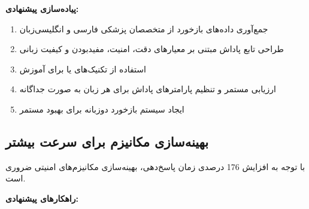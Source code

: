 \documentclass[11pt, a4paper, oneside]{book}
\begin{document}
	\textbf{پیاده‌سازی پیشنهادی:}
	\begin{enumerate}
		\item جمع‌آوری داده‌های بازخورد از متخصصان پزشکی فارسی و انگلیسی‌زبان
		\item طراحی تابع پاداش مبتنی بر معیارهای دقت، امنیت، مفیدبودن و کیفیت زبانی
		\item استفاده از تکنیک‌های  یا  برای آموزش
		\item ارزیابی مستمر و تنظیم پارامترهای پاداش برای هر زبان به صورت جداگانه
		\item ایجاد سیستم بازخورد دوزبانه برای بهبود مستمر
	\end{enumerate}

	\subsection{بهینه‌سازی مکانیزم  برای سرعت بیشتر}

	با توجه به افزایش 176 درصدی زمان پاسخ‌دهی، بهینه‌سازی مکانیزم‌های امنیتی ضروری است.

	\textbf{راهکارهای پیشنهادی:}
\end{document}
